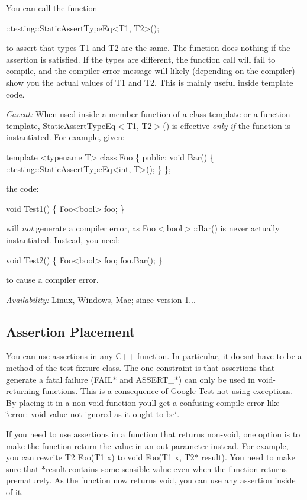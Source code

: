 You can call the function 
\begin{DoxyCode}
::testing::StaticAssertTypeEq<T1, T2>();
\end{DoxyCode}
 to assert that types {\ttfamily T1} and {\ttfamily T2} are the same. The function does nothing if the assertion is satisfied. If the types are different, the function call will fail to compile, and the compiler error message will likely (depending on the compiler) show you the actual values of {\ttfamily T1} and {\ttfamily T2}. This is mainly useful inside template code.

{\itshape Caveat\+:} When used inside a member function of a class template or a function template, {\ttfamily Static\+Assert\+Type\+Eq$<$T1, T2$>$()} is effective {\itshape only if} the function is instantiated. For example, given\+: 
\begin{DoxyCode}
template <typename T> class Foo \{
 public:
  void Bar() \{ ::testing::StaticAssertTypeEq<int, T>(); \}
\};
\end{DoxyCode}
 the code\+: 
\begin{DoxyCode}
void Test1() \{ Foo<bool> foo; \}
\end{DoxyCode}
 will {\itshape not} generate a compiler error, as {\ttfamily Foo$<$bool$>$\+::\+Bar()} is never actually instantiated. Instead, you need\+: 
\begin{DoxyCode}
void Test2() \{ Foo<bool> foo; foo.Bar(); \}
\end{DoxyCode}
 to cause a compiler error.

{\itshape Availability\+:} Linux, Windows, Mac; since version 1...

\subsection*{Assertion Placement}

You can use assertions in any C++ function. In particular, it doesn\textquotesingle{}t have to be a method of the test fixture class. The one constraint is that assertions that generate a fatal failure ({\ttfamily F\+A\+I\+L$\ast$} and {\ttfamily A\+S\+S\+E\+R\+T\+\_\+$\ast$}) can only be used in void-\/returning functions. This is a consequence of Google Test not using exceptions. By placing it in a non-\/void function you\textquotesingle{}ll get a confusing compile error like {\ttfamily \char`\"{}error\+: void value not ignored as it ought to be\char`\"{}}.

If you need to use assertions in a function that returns non-\/void, one option is to make the function return the value in an out parameter instead. For example, you can rewrite {\ttfamily T2 Foo(\+T1 x)} to {\ttfamily void Foo(\+T1 x, T2$\ast$ result)}. You need to make sure that {\ttfamily $\ast$result} contains some sensible value even when the function returns prematurely. As the function now returns {\ttfamily void}, you can use any assertion inside of it.


